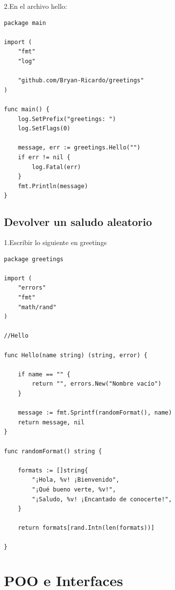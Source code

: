 \documentclass[10pt,a4paper]{article}
\begin{document}
2.En el archivo hello: 

\begin{verbatim}
package main

import (
	"fmt"
	"log"

	"github.com/Bryan-Ricardo/greetings"
)

func main() {
	log.SetPrefix("greetings: ")
	log.SetFlags(0)

	message, err := greetings.Hello("")
	if err != nil {
		log.Fatal(err)
	}
	fmt.Println(message)
}
\end{verbatim}

\newpage
\subsection{Devolver un saludo aleatorio}
1.Escribir lo siguiente en greetings
\begin{verbatim}
package greetings

import (
	"errors"
	"fmt"
	"math/rand"
)

//Hello

func Hello(name string) (string, error) {

	if name == "" {
		return "", errors.New("Nombre vacío")
	}

	message := fmt.Sprintf(randomFormat(), name)
	return message, nil
}

func randomFormat() string {

	formats := []string{
		"¡Hola, %v! ¡Bienvenido",
		"¡Qué bueno verte, %v!",
		"¡Saludo, %v! ¡Encantado de conocerte!",
	}

	return formats[rand.Intn(len(formats))]

}
\end{verbatim}
\newpage
\section{POO e Interfaces }
\end{document}

